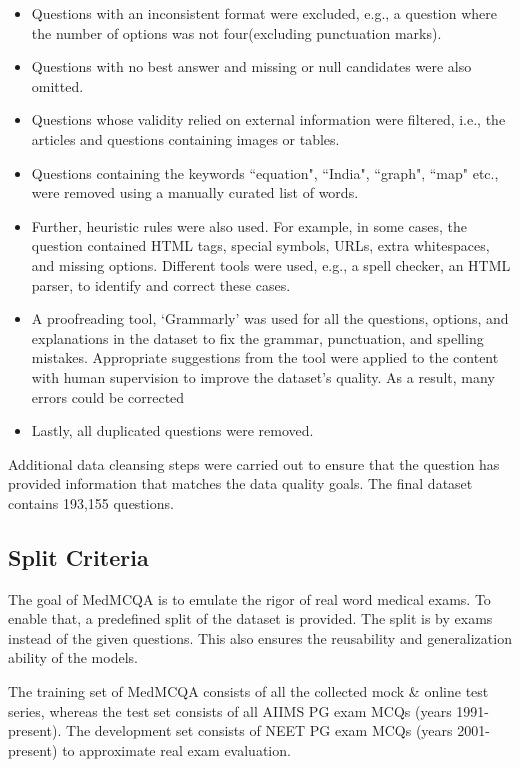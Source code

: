 \documentclass[pmlr,twocolumn,10pt]{jmlr}
\begin{document}
\begin{itemize}
    \item Questions with an inconsistent format were excluded, e.g., a question where the number of options was not four(excluding punctuation marks).
    \item Questions with no best answer and missing or null candidates were also omitted.
    \item Questions whose validity relied on external information were filtered, i.e., the articles and questions containing images or tables.
    \item Questions containing the keywords ``equation", ``India", ``graph", ``map" etc., were removed using a manually curated list of words.
    \item Further, heuristic rules were also used. For example, in some cases, the question contained HTML tags, special symbols, URLs, extra whitespaces, and missing options. Different tools were used, e.g., a spell checker, an HTML parser, to identify and correct these cases.
    \item A proofreading tool, `Grammarly' was used for all the questions, options, and explanations in the dataset to fix the grammar, punctuation, and spelling mistakes. Appropriate suggestions from the tool were applied to the content with human supervision to improve the dataset's quality. As a result, many errors could be corrected
    \item Lastly, all duplicated questions were removed.
\end{itemize}









Additional data cleansing steps were carried out to ensure that the question has provided information that matches the data quality goals. The final dataset contains 193,155 questions.

\subsection{Split Criteria}
\label{apd:gll}
The goal of MedMCQA is to emulate the rigor of real word medical exams. To enable that, a predefined split of the dataset is provided. The split is by exams instead of the given questions. This also ensures the reusability and generalization ability of the models. 

The training set of MedMCQA consists of all the collected mock \& online test series, whereas the test set consists of all AIIMS PG exam MCQs (years 1991-present). The development set consists of NEET PG exam MCQs (years 2001-present) to approximate real exam evaluation.
\end{document}
